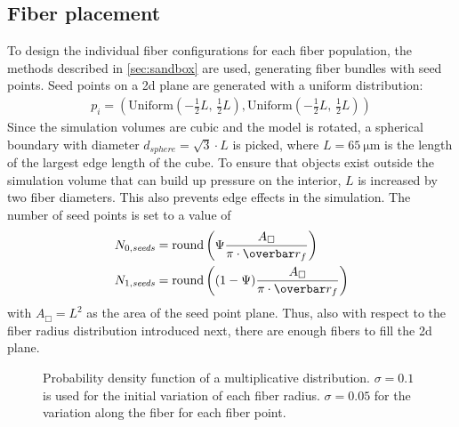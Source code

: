 \subsection{Fiber placement}
%
To design the individual fiber configurations for each fiber population, the methods described in \cref{sec:sandbox} are used, \ie{} generating fiber bundles with seed points.
Seed points on a 2d plane are generated with a uniform distribution:
\begin{align}
p_i = (\mathrm{Uniform}(-\frac{1}{2}\mathit{L}, \, \frac{1}{2}\mathit{L}), \mathrm{Uniform}(-\frac{1}{2}\mathit{L}, \, \frac{1}{2}\mathit{L}))
\end{align}
Since the simulation volumes are cubic and the model is rotated, a spherical boundary with diameter $d_{\mathit{sphere}}=\sqrt{3} \cdot \mathit{L}$ is picked, where $\mathit{L}=\SI{65}{\micro\meter}$ is the length of the largest edge length of the cube.
To ensure that objects exist outside the simulation volume that can build up pressure on the interior, $\mathit{L}$ is increased by two fiber diameters.
This also prevents edge effects in the simulation.
The number of seed points is set to a value of
\begin{align}
N_{0,\mathit{seeds}} &= \round \left(\modelPsi \frac{A_{\Box}}{\pi \cdot \fiberRadiusMean}\right)\\
N_{1,\mathit{seeds}} &= \round \left((1-\modelPsi) \frac{A_{\Box}}{\pi \cdot \fiberRadiusMean}\right)
\end{align}
with $A_{\Box}=L^2$ as the area of the seed point plane.
Thus, also with respect to the fiber radius distribution introduced next, there are enough fibers to fill the 2d plane.
\par
%
\begin{figure}[!t]
\centering
\caption[]{Probability density function of a multiplicative  distribution.
$\sigma=0.1$ is used for the initial variation of each fiber radius.
$\sigma=0.05$ for the variation along the fiber for each fiber point.}
\label{fig:logNormal}
\end{figure}
